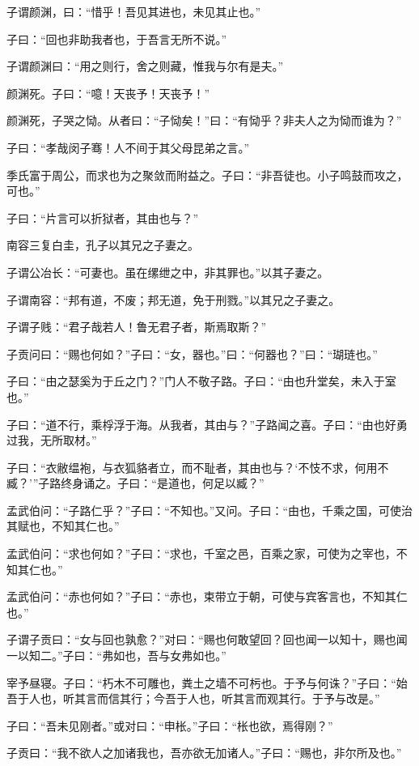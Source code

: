 \documentclass[a5paper]{ctexbook}
\begin{document}
    子谓颜渊，曰：“惜乎！吾见其进也，未见其止也。”

    子曰：“回也非助我者也，于吾言无所不说。”

    子谓颜渊曰：“用之则行，舍之则藏，惟我与尔有是夫。”

    颜渊死。子曰：“噫！天丧予！天丧予！”

    颜渊死，子哭之恸。从者曰：“子恸矣！”曰：“有恸乎？非夫人之为恸而谁为？”

    子曰：“孝哉闵子骞！人不间于其父母昆弟之言。”

    季氏富于周公，而求也为之聚敛而附益之。子曰：“非吾徒也。小子鸣鼓而攻之，可也。”

    子曰：“片言可以折狱者，其由也与？”

    南容三复白圭，孔子以其兄之子妻之。

    子谓公冶长：“可妻也。虽在缧绁之中，非其罪也。”以其子妻之。

    子谓南容：“邦有道，不废；邦无道，免于刑戮。”以其兄之子妻之。

    子谓子贱：“君子哉若人！鲁无君子者，斯焉取斯？”

    子贡问曰：“赐也何如？”子曰：“女，器也。”曰：“何器也？”曰：“瑚琏也。”

    子曰：“由之瑟奚为于丘之门？”门人不敬子路。子曰：“由也升堂矣，未入于室也。”

    子曰：“道不行，乘桴浮于海。从我者，其由与？”子路闻之喜。子曰：“由也好勇过我，无所取材。”

    子曰：“衣敝缊袍，与衣狐貉者立，而不耻者，其由也与？‘不忮不求，何用不臧？’”子路终身诵之。子曰：“是道也，何足以臧？”

    孟武伯问：“子路仁乎？”子曰：“不知也。”又问。子曰：“由也，千乘之国，可使治其赋也，不知其仁也。” 
    
    孟武伯问：“求也何如？”子曰：“求也，千室之邑，百乘之家，可使为之宰也，不知其仁也。” 
    
    孟武伯问：“赤也何如？”子曰：“赤也，束带立于朝，可使与宾客言也，不知其仁也。”

    子谓子贡曰：“女与回也孰愈？”对曰：“赐也何敢望回？回也闻一以知十，赐也闻一以知二。”子曰：“弗如也，吾与女弗如也。”

    宰予昼寝。子曰：“朽木不可雕也，粪土之墙不可杇也。于予与何诛？”子曰：“始吾于人也，听其言而信其行；今吾于人也，听其言而观其行。于予与改是。”

    子曰：“吾未见刚者。”或对曰：“申枨。”子曰：“枨也欲，焉得刚？”

    子贡曰：“我不欲人之加诸我也，吾亦欲无加诸人。”子曰：“赐也，非尔所及也。”
\end{document}
